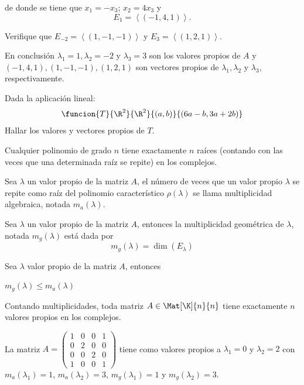\documentclass[compacto,10pt]{pubciencias-notas}
\begin{document}
\begin{ejem}
de donde se tiene que $x_{1}=-x_{3}$; $x_{2}=4x_{3}$ y
\[
    E_1 = \left \langle (-1,4,1) \right \rangle.
\]

Verifique que $ E_{-2} =\left  \langle (1,-1,-1)  \right \rangle$ y $ E_3=\left \langle (1,2,1)  \right \rangle.$




En conclusión $\lambda_{1}=1,\lambda_{2}=-2$ y $\lambda_{3}=3$ son los valores propios de $A$ y $(-1,4,1),(1,-1,-1),(1,2,1)$ son vectores propios de
$\lambda_{1},\lambda_{2}$ y $\lambda_{3}$, respectivamente. 

\end{ejem}






\begin{ejer}\hspace{0pt}
Dada la aplicación lineal:
\[
    \funcion{T}{\R^2}{\R^2}{(a,b)}{(6a-b,3a+2b)}
\]
Hallar los valores y vectores propios de $T$.
\end{ejer}

\begin{teo}
Cualquier polinomio de grado $n$ tiene exactamente $n$ raíces (contando con las veces que una determinada raíz se repite) en los complejos.
\end{teo}

\begin{defi}
Sea $\lambda$ un valor propio de la matriz $A$, el número de veces que un valor propio $\lambda$ se repite como raíz del polinomio característico $\rho(\lambda)$ se llama multiplicidad algebraica, notada $m_a(\lambda)$.
\end{defi}

\begin{defi}
Sea $\lambda$ un valor propio de la matriz $A$, entonces la multiplicidad geométrica de $\lambda$, notada $m_g(\lambda)$ está dada por
\[ m_g(\lambda) = \dim(E_\lambda)\]
\end{defi}

\begin{teo}
Sea $\lambda$ valor propio de la matriz $A$, entonces
\begin{center}
 $m_g(\lambda) \leq m_a(\lambda)$
\end{center}
\end{teo}

\begin{teo}
Contando multiplicidades, toda matriz $A \in \Mat[\K]{n}{n} $ tiene exactamente $n$ valores propios en los complejos.
\end{teo}

\begin{ejem}\hspace{0pt}\label{Cap7:ejem03} La matriz $A = \begin{pmatrix}1&0&0&1\\0&2&0&0\\0&0&2&0\\1&0&0&1\end{pmatrix}$ tiene como valores propios a $\lambda_{1} = 0$ y $\lambda_{2}=2$ con $m_a(\lambda_{1})=1$, $m_a(\lambda_{2})=3$, $m_g(\lambda_{1})=1$ y $m_g(\lambda_{2})=3$.
\end{ejem}
\end{document}
